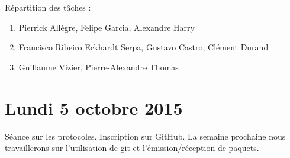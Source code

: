 \documentclass[a4paper, 11pt]{article}
\begin{document}
Répartition des tâches :
\begin{enumerate}
	\item Pierrick Allègre, Felipe Garcia, Alexandre Harry
	\item Francisco Ribeiro Eckhardt Serpa, Gustavo Castro, Clément Durand
	\item Guillaume Vizier, Pierre-Alexandre Thomas
\end{enumerate}

\section{Lundi 5 octobre 2015}

Séance sur les protocoles. Inscription sur GitHub. La semaine prochaine nous travaillerons sur l'utilisation de git et l'émission/réception de paquets.
\end{document}
